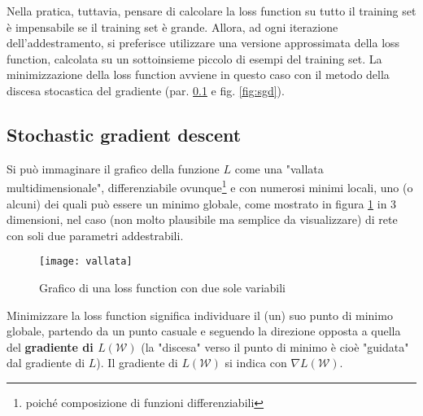Nella pratica, tuttavia, pensare di calcolare la loss function su tutto il training set è impensabile se il training set è grande. Allora, ad ogni iterazione dell'addestramento, si preferisce utilizzare una versione approssimata della loss function, calcolata su un sottoinsieme piccolo di esempi del training set. La minimizzazione della loss function avviene in questo caso con il metodo della discesa stocastica del gradiente (par. \ref{SGD} e fig. \ref{fig:sgd}).

\subsection{Stochastic gradient descent}
\label{SGD}
Si può immaginare il grafico della funzione $L$ come una "vallata multidimensionale", differenziabile ovunque\footnote{poiché composizione di funzioni differenziabili} e con numerosi minimi locali, uno (o alcuni) dei quali può essere un minimo globale, come mostrato in figura \ref{vallata} in 3 dimensioni, nel caso (non molto plausibile ma semplice da visualizzare) di rete con soli due parametri addestrabili.

\begin{figure}[h!]
\centering
\texttt{[image: vallata]}
\caption{Grafico di una loss function con due sole variabili}
\label{vallata}
\end{figure}

Minimizzare la loss function significa individuare il (un) suo punto di minimo globale, partendo da un punto casuale e seguendo la direzione opposta a quella del \textbf{gradiente di $L(\mathcal{W})$} (la "discesa" verso il punto di minimo è cioè "guidata" dal gradiente di $L$). Il gradiente di $L(\mathcal{W})$ si indica con $\nabla L(\mathcal{W})$.

